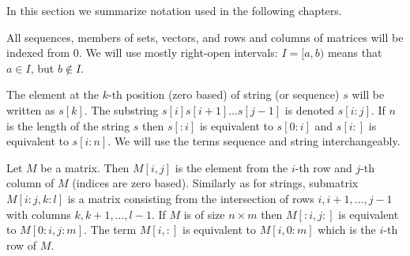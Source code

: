 In this section we summarize notation used in the following
chapters.

All sequences, members of sets, vectors, and rows and columns of matrices will
be indexed from $0$. We will use mostly right-open intervals: $I=[a,b)$ means
that $a\in I$, but $b\notin I$. 

The element at the $k$-th position (zero based) of string (or sequence) $s$ will
be written as $s[k]$. The substring $s[i]s[i+1]\dots s[j-1]$ is denoted
$s[i:j]$.  If $n$ is the length of the string $s$ then $s[:i]$ is equivalent to
$s[0:i]$ and $s[i:]$ is equivalent to $s[i:n]$.  We will use the terms sequence
and string interchangeably.

Let $M$ be a matrix. Then $M[i,j]$ is the element from the $i$-th row and $j$-th
column of $M$ (indices are zero based). Similarly as for strings, submatrix
$M[i:j,k:l]$ is a matrix consisting from the intersection of rows $i,i+1,\dots,
j-1$ with columns $k,k+1,\dots,l-1$. If $M$ is of size $n\times m$ then
$M[:i,j:]$ is equivalent to $M[0:i,j:m]$.  The term $M[i,:]$ is equivalent to
$M[i,0:m]$ which is the $i$-th row of $M$.
